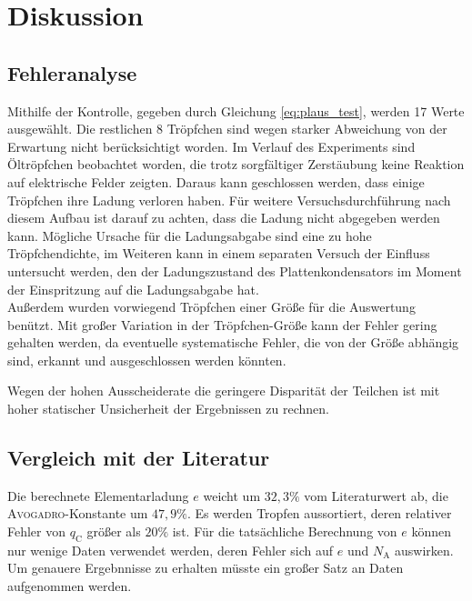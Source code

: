 \newpage
\section{Diskussion}
\label{sec:Diskussion}

\subsection{Fehleranalyse}
Mithilfe der Kontrolle, gegeben durch Gleichung \eqref{eq:plaus_test}, werden 17 Werte ausgewählt.
Die restlichen 8 Tröpfchen sind wegen starker Abweichung von der Erwartung nicht berücksichtigt worden.
Im Verlauf des Experiments sind Öltröpfchen beobachtet worden, die trotz sorgfältiger Zerstäubung keine Reaktion auf elektrische Felder zeigten. 
Daraus kann geschlossen werden, dass einige Tröpfchen ihre Ladung verloren haben.
Für weitere Versuchsdurchführung nach diesem Aufbau ist darauf zu achten, dass die Ladung nicht abgegeben werden kann.
Mögliche Ursache für die Ladungsabgabe sind eine zu hohe Tröpfchendichte,
im Weiteren kann in einem separaten Versuch der Einfluss untersucht werden, 
den der Ladungszustand des Plattenkondensators im Moment der Einspritzung auf die Ladungsabgabe hat.\\
Außerdem wurden vorwiegend Tröpfchen einer Größe für die Auswertung benützt.
Mit großer Variation in der Tröpfchen-Größe kann der Fehler gering gehalten werden, da eventuelle systematische Fehler, die von der Größe abhängig sind, erkannt und ausgeschlossen werden könnten.

Wegen der hohen Ausscheiderate die geringere Disparität der Teilchen ist mit hoher statischer Unsicherheit der Ergebnissen zu rechnen.

\subsection{Vergleich mit der Literatur}
Die berechnete Elementarladung $e$ weicht um $32,3\%$ vom Literaturwert ab, die \textsc{Avogadro}-Konstante um $47,9\%$. 
Es werden Tropfen aussortiert, deren relativer Fehler von $q_\mathup{C}$ größer als $20\%$ ist. Für die tatsächliche Berechnung von $e$ können nur wenige Daten verwendet werden, deren Fehler sich auf $e$ und $N_\mathup{A}$ auswirken. Um genauere Ergebnnisse zu erhalten müsste ein großer Satz an Daten aufgenommen werden. 
